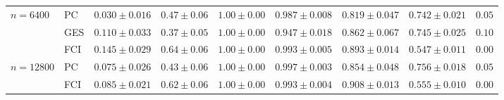 \begin{tabular}{llccccccc}
$n{=}6400$ & PC & $0.030\pm0.016$ & $0.47\pm0.06$ & $1.00\pm0.00$ & $0.987\pm0.008$ & $0.819\pm0.047$ & $0.742\pm0.021$ & $0.05$ \\
 & GES & $0.110\pm0.033$ & $0.37\pm0.05$ & $1.00\pm0.00$ & $0.947\pm0.018$ & $0.862\pm0.067$ & $0.745\pm0.025$ & $0.10$ \\
 & FCI & $0.145\pm0.029$ & $0.64\pm0.06$ & $1.00\pm0.00$ & $0.993\pm0.005$ & $0.893\pm0.014$ & $0.547\pm0.011$ & $0.00$ \\
$n{=}12800$ & PC & $0.075\pm0.026$ & $0.43\pm0.06$ & $1.00\pm0.00$ & $0.997\pm0.003$ & $0.854\pm0.048$ & $0.756\pm0.018$ & $0.05$ \\
 & FCI & $0.085\pm0.021$ & $0.62\pm0.06$ & $1.00\pm0.00$ & $0.993\pm0.004$ & $0.908\pm0.013$ & $0.555\pm0.010$ & $0.00$ \\
\bottomrule
\end{tabular}
